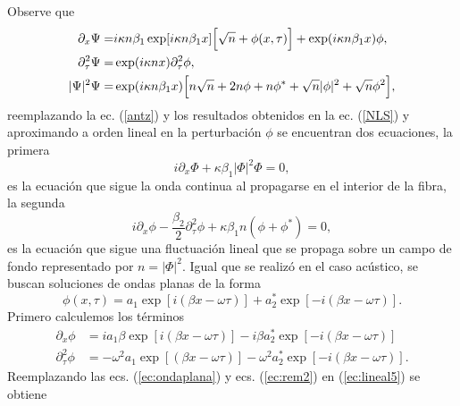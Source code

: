 Observe que
\begin{align}\label{ec:remplazo}
 \partial_{x}\Psi=&i\kappa n \beta_1\exp[i\kappa n\beta_1 x]\Bigl[\sqrt{n}+\phi(x,\tau)\Bigr]+\exp(i\kappa n\beta_1 x)\phi,\\
 \partial_{\tau}^2\Psi=&\exp(i\kappa n x)\partial_{\tau}^2\phi,\\
|\Psi|^2\Psi=&\exp(i\kappa n\beta_1 x)\Bigl[n\sqrt{n}+2n\phi+ n\phi^{*}+\sqrt{n}|\phi|^2+\sqrt{n}\phi^2\Bigr],
\end{align}
reemplazando la ec. (\ref{antz}) y los resultados obtenidos en la ec. (\ref{NLS}) y aproximando a orden lineal en la perturbaci\'{o}n $\phi$ se encuentran dos ecuaciones, la primera
\begin{equation}
i\partial_x\Phi+\kappa\beta_1|\Phi|^2\Phi=0,
\end{equation}
es la ecuaci\'{o}n que sigue la onda continua al propagarse en el interior de la fibra, la segunda
\begin{equation}\label{ec:lineal5}
i\partial_{x}\phi-\frac{\beta_2}{2}\partial_{\tau}^2\phi+\kappa\beta_1 n (\phi+\phi^{*})=0,
\end{equation}
es la ecuaci\'{o}n que sigue una fluctuaci\'{o}n lineal que se propaga sobre un campo de fondo representado por $n=|\Phi|^2$. Igual que se realiz\'{o} en el caso ac\'{u}stico, se buscan soluciones de ondas planas de la forma
\begin{equation}\label{ec:ondaplana}
\phi(x,\tau)=a_1\exp[i(\beta x-\omega \tau)]+a_2^*\exp[-i(\beta x-\omega \tau)].
\end{equation}
Primero calculemos los t\'{e}rminos
\begin{align}\label{ec:rem2}
\nonumber \partial_{x}\phi&=ia_1\beta\exp[i(\beta x-\omega \tau)]-i\beta a_2^*\exp[-i(\beta x-\omega \tau)]\\
\nonumber \partial_{\tau}^2\phi&=-\omega^2a_1\exp[(\beta x-\omega \tau)]-\omega^2a_2^*\exp[-i(\beta x-\omega \tau)].
\end{align}
Reemplazando las ecs. (\ref{ec:ondaplana}) y ecs. (\ref{ec:rem2}) en (\ref{ec:lineal5}) se obtiene

